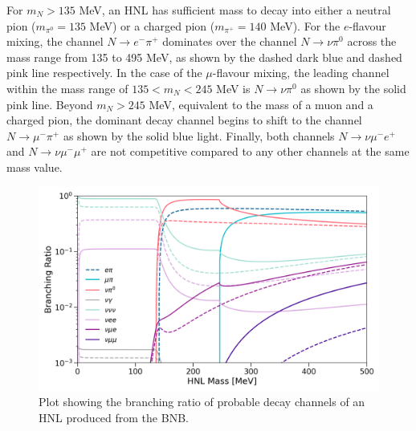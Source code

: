 For $m_{N} > 135$ MeV, an HNL has sufficient mass to decay into either a neutral pion ($m_{\pi^{0}}=135$ MeV) or a charged pion ($m_{\pi^{+}}=140$ MeV). 
For the $e$-flavour mixing, the channel $N\rightarrow e^{-}\pi^{+}$ dominates over the channel $N\rightarrow \nu \pi^{0}$ across the mass range from 135 to 495 MeV, as shown by the dashed dark blue and dashed pink line respectively.
In the case of the $\mu$-flavour mixing, the leading channel within the mass range of $135 < m_{N} < 245 $ MeV is $N\rightarrow \nu \pi^{0}$ as shown by the solid pink line.
Beyond $m_{N} > 245$ MeV, equivalent to the mass of a muon and a charged pion, the dominant decay channel begins to shift to the channel $N\rightarrow \mu^{-}\pi^{+}$ as shown by the solid blue light. 
Finally, both channels $N\rightarrow \nu \mu^{-}e^{+}$ and $N\rightarrow \nu \mu^{-}\mu^{+}$ are not competitive compared to any other channels at the same mass value.  

\begin{figure}[ht!] 
\centering    
\includegraphics[width=1.0\textwidth]{branching_ratio}
\caption[Branching Ratio of Heavy Neutral Leptons]
{
Plot showing the branching ratio of probable decay channels of an HNL produced from the BNB.
}
\label{fig:branchingRatio}
\end{figure}


